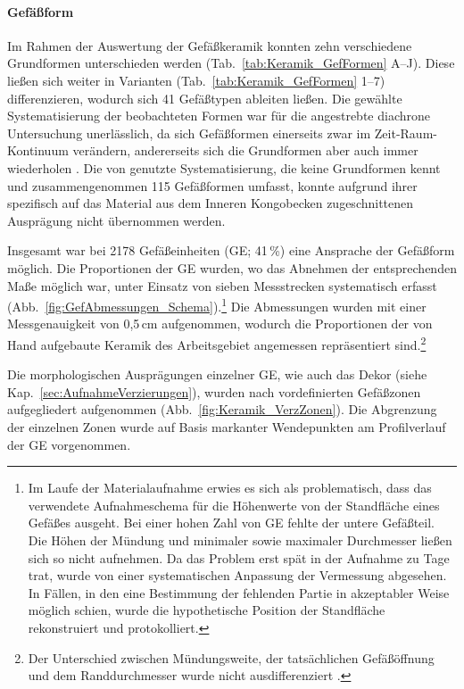 \paragraph{Gefäßform}
$\;$ \\
Im Rahmen der Auswertung der Gefäßkeramik konnten zehn verschiedene Grundformen unterschieden werden (Tab.~\ref{tab:Keramik_GefFormen} A--J). Diese ließen sich weiter in Varianten (Tab.~\ref{tab:Keramik_GefFormen} 1--7) differenzieren, wodurch sich 41 Gefäßtypen ableiten ließen. Die gewählte Systematisierung der beobachteten Formen war für die angestrebte diachrone Untersuchung unerlässlich, da sich Gefäßformen einerseits zwar im Zeit-Raum-Kontinuum verändern, andererseits sich die Grundformen aber auch immer wiederholen \parencite[86]{Saev.2015}. Die von \textcite{Wotzka.1995} genutzte Systematisierung, die keine Grundformen kennt und zusammengenommen 115 Gefäßformen umfasst, konnte aufgrund ihrer spezifisch auf das Material aus dem Inneren Kongobecken zugeschnittenen Ausprägung nicht übernommen werden.

Insgesamt war bei 2178 Gefäßeinheiten (GE; 41\,\%) eine Ansprache der Gefäßform möglich. Die Proportionen der GE wurden, wo das Abnehmen der entsprechenden Maße möglich war, unter Einsatz von sieben Messstrecken systematisch erfasst (Abb.~\ref{fig:GefAbmessungen_Schema}).\footnote{Im Laufe der Materialaufnahme erwies es sich als problematisch, dass das verwendete Aufnahmeschema für die Höhenwerte von der Standfläche eines Gefäßes ausgeht. Bei einer hohen Zahl von GE fehlte der untere Gefäßteil. Die Höhen der Mündung und minimaler sowie maximaler Durchmesser ließen sich so nicht aufnehmen. Da das Problem erst spät in der Aufnahme zu Tage trat, wurde von einer systematischen Anpassung der Vermessung abgesehen. In Fällen, in den eine Bestimmung der fehlenden Partie in akzeptabler Weise möglich schien, wurde die hypothetische Position der Standfläche rekonstruiert und protokolliert.} Die Abmessungen wurden mit einer Messgenauigkeit von 0,5\,cm aufgenommen, wodurch die Proportionen der von Hand aufgebaute Keramik des Arbeitsgebiet angemessen repräsentiert sind.\footnote{Der Unterschied zwischen Mündungsweite, der tatsächlichen Gefäßöffnung und dem Randdurchmesser wurde nicht ausdifferenziert \parencite[siehe][88]{Saev.2015}.}

Die morphologischen Ausprägungen einzelner GE, wie auch das Dekor (siehe Kap.~\ref{sec:AufnahmeVerzierungen}), wurden nach vordefinierten Gefäßzonen aufgegliedert aufgenommen (Abb.~\ref{fig:Keramik_VerzZonen}). Die Abgrenzung der einzelnen Zonen wurde auf Basis markanter Wendepunkten am Profilverlauf der GE vorgenommen.


